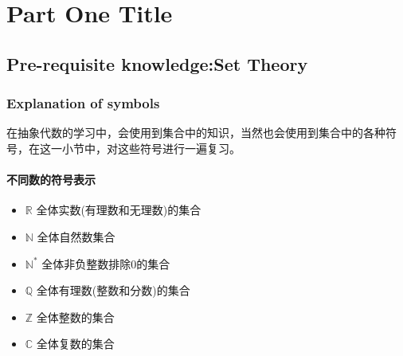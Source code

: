 \documentclass[
	11pt, %
	fleqn, %
	a4paper, %
]{LegrandOrangeBook}
\begin{document}
\pagestyle{empty} %

\tableofcontents %

\listoffigures %

\listoftables %

\pagestyle{fancy} %

\cleardoublepage %


\part{Part One Title}


\chapterspaceabove{6.75cm} %
\chapterspacebelow{7.25cm} %


\chapter{Pre-requisite knowledge:Set Theory}

\section{Explanation of symbols}
在抽象代数的学习中，会使用到集合中的知识，当然也会使用到集合中的各种符号，在这一小节中，对这些符号进行一遍复习。
\subsection{不同数的符号表示}
\begin{itemize}
	\item $\mathbb{R}$ 全体实数(有理数和无理数)的集合
	\item $\mathbb{N}$ 全体自然数集合
	\item $\mathbb{N^*}$ 全体非负整数排除0的集合
	\item $\mathbb{Q}$ 全体有理数(整数和分数)的集合
	\item $\mathbb{Z}$ 全体整数的集合
	\item $\mathbb{C}$ 全体复数的集合
\end{itemize}
\end{document}
